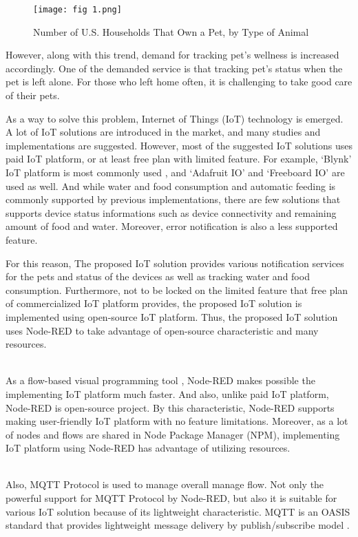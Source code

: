 \documentclass[conference]{IEEEtran}
\begin{document}
\begin{figure}[htbp]
\centerline{\texttt{[image: fig 1.png]}}
\caption{Number of U.S. Households That Own a Pet, by Type of Animal
}
\label{fig}
\end{figure}

However, along with this trend, demand for tracking pet’s wellness is increased accordingly. One of the demanded service is that tracking pet’s status when the pet is left alone. For those who left home often, it is challenging to take good care of their pets.

\indent As a way to solve this problem, Internet of Things (IoT) technology is emerged. A lot of IoT solutions are introduced in the market, and many studies and implementations are suggested. However, most of the suggested IoT solutions uses paid IoT platform, or at least free plan with limited feature. For example, ‘Blynk’ IoT platform is most commonly used \cite{b2} \cite{b3} \cite{b4} \cite{b5}, and ‘Adafruit IO’ \cite{b6} and ‘Freeboard IO’ \cite{b7} are used as well. And while water and food consumption and automatic feeding is commonly supported by previous implementations, there are few solutions that supports device status informations such as device connectivity and remaining amount of food and water. Moreover, error notification is also a less supported feature.

For this reason, The proposed IoT solution provides various notification services for the pets and status of the devices as well as tracking water and food consumption. Furthermore, not to be locked on the limited feature that free plan of commercialized IoT platform provides, the proposed IoT solution is implemented using open-source IoT platform. Thus, the proposed IoT solution uses Node-RED to take advantage of open-source characteristic and many resources.

\\ \indent As a flow-based visual programming tool \cite{b8}, Node-RED makes possible the implementing IoT platform much faster. And also, unlike paid IoT platform, Node-RED is open-source project. By this characteristic, Node-RED supports making user-friendly IoT platform with no feature limitations. Moreover, as a lot of nodes and flows are shared in Node Package Manager (NPM), implementing IoT platform using Node-RED has advantage of utilizing resources.

\\ \indent Also, MQTT Protocol is used to manage overall manage flow. Not only the powerful support for MQTT Protocol by Node-RED, but also it is suitable for various IoT solution because of its lightweight characteristic. MQTT is an OASIS standard that provides lightweight message delivery by publish/subscribe model \cite{b9}.
\end{document}
